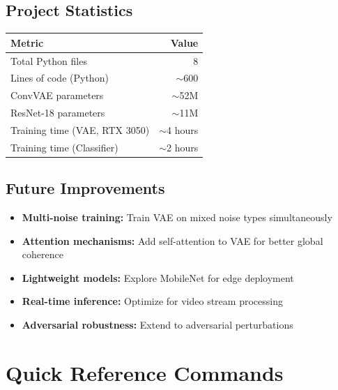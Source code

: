 \documentclass[11pt,a4paper]{article}
\begin{document}
\subsection{Project Statistics}

\begin{table}[H]
    \centering
    \begin{tabular}{lr}
        \toprule
        \textbf{Metric} & \textbf{Value} \\
        \midrule
        Total Python files & 8 \\
        Lines of code (Python) & $\sim$600 \\
        ConvVAE parameters & $\sim$52M \\
        ResNet-18 parameters & $\sim$11M \\
        Training time (VAE, RTX 3050) & $\sim$4 hours \\
        Training time (Classifier) & $\sim$2 hours \\
        \bottomrule
    \end{tabular}
\end{table}

\subsection{Future Improvements}

\begin{itemize}[noitemsep]
    \item \textbf{Multi-noise training:} Train VAE on mixed noise types simultaneously
    \item \textbf{Attention mechanisms:} Add self-attention to VAE for better global coherence
    \item \textbf{Lightweight models:} Explore MobileNet for edge deployment
    \item \textbf{Real-time inference:} Optimize for video stream processing
    \item \textbf{Adversarial robustness:} Extend to adversarial perturbations
\end{itemize}


\appendix
\newpage
\section{Quick Reference Commands}
\label{app:commands}
\end{document}
